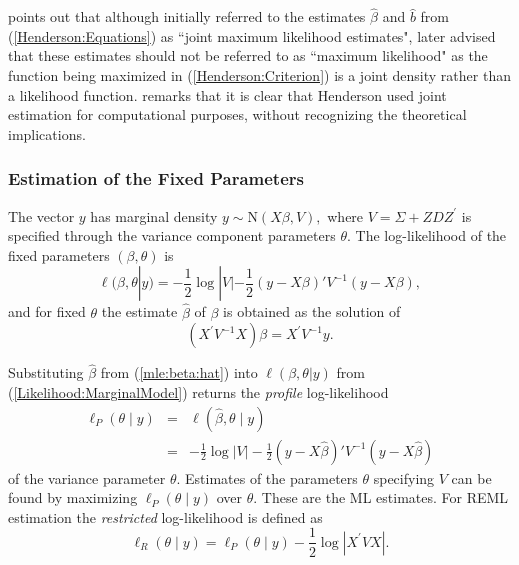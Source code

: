 \documentclass[12pt, a4paper]{report}
\theoremstyle{plain}
\theoremstyle{definition}
\theoremstyle{remark}
\begin{document}
\cite{Robi:BLUP:1991} points out that although \cite{Henderson:1950} initially referred to the estimates $\hat{\beta}$ and $\hat{b}$ from (\ref{Henderson:Equations}) as ``joint maximum likelihood estimates", \cite{Henderson:1973} later advised that these estimates should not be referred to as ``maximum likelihood" as the function being maximized in (\ref{Henderson:Criterion}) is a joint density rather than a likelihood function. \cite{YLee} remarks that it is clear that Henderson used joint estimation for computational purposes, without recognizing the theoretical implications.


\subsubsection{Estimation of the Fixed Parameters}

The vector $y$ has marginal density $y \sim \mathrm{N}(X \beta,V),$ where $V = \Sigma + ZDZ^\prime$ is specified through the variance component parameters $\theta.$ The log-likelihood of the fixed parameters $(\beta, \theta)$ is
\begin{equation}
\ell (\beta, \theta|y) =
-\frac{1}{2} \log |V| -\frac{1}{2}(y -
X \beta)'V^{-1}(y -
X \beta), \label{Likelihood:MarginalModel}
\end{equation}
and for fixed $\theta$ the estimate $\hat{\beta}$ of $\beta$ is obtained as the solution of
\begin{equation}
(X^\prime V^{-1}X) {\beta} = X^\prime V^{-1}y.
\label{mle:beta:hat}
\end{equation}

Substituting $\hat{\beta}$ from (\ref{mle:beta:hat}) into $\ell(\beta, \theta|y)$ from (\ref{Likelihood:MarginalModel}) returns the \emph{profile} log-likelihood
\begin{eqnarray*}
\ell_P(\theta \mid y) &=& \ell(\hat{\beta}, \theta \mid y) \\
&=& -\frac{1}{2} \log |V| -\frac{1}{2}(y - X \hat{\beta})'V^{-1}(y - X \hat{\beta})
\end{eqnarray*}
of the variance parameter $\theta.$ Estimates of the parameters $\theta$ specifying $V$ can be found by maximizing $\ell_P(\theta \mid y)$ over $\theta.$ These are the ML estimates. For REML estimation the \emph{restricted} log-likelihood is defined as
\[
\ell_R(\theta \mid y) =
\ell_P(\theta \mid y) -\frac{1}{2} \log |X^\prime VX |.
\]
\end{document}
